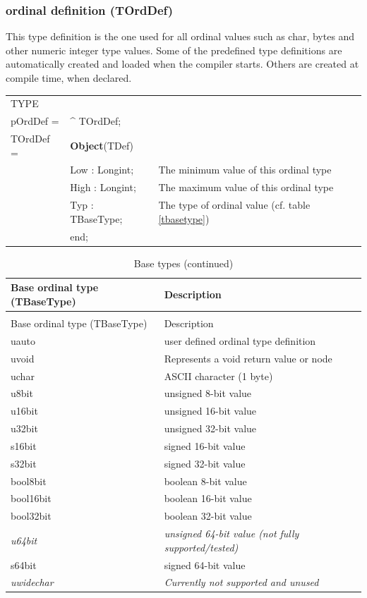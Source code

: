 \documentclass [a4paper,12pt]{article}
\begin{document}
\subsubsection{ordinal definition (TOrdDef)}
\label{subsubsec:ordinal}

This type definition is the one used for all ordinal values such as char,
bytes and other numeric integer type values. Some of the predefined type
definitions are automatically created and loaded when the compiler starts.
Others are created at compile time, when declared.

\begin{tabular*}{6.5in}{|l@{\extracolsep{\fill}}lp{9cm}|}
\hline
\textsf{TYPE} & &  \\
\xspace pOrdDef = & \^{}  TOrdDef; & \\
\xspace \textsf{TOrdDef} = & \textbf{Object}(TDef) & \\
&\textsf{Low : Longint;}&
    The minimum value of this ordinal type \\
&\textsf{High : Longint;}&
    The maximum value of this ordinal type \\
&\textsf{Typ : TBaseType;}&
    The type of ordinal value (cf. table \ref{tbasetype}) \\
&\textsf{end;}&  \\
\hline
\end{tabular*}

\begin{longtable}{|l|p{10cm}|}
\caption{Base types}\label{tbasetyp}\\
\hline
Base ordinal type (TBaseType) & Description \\
\hline
\endfirsthead
\caption{Base types (continued)}\\
\hline
Base ordinal type (TBaseType) & Description \\
\hline
\endhead
\hline
\endfoot
\textsf{uauto} & user defined ordinal type definition \\
\textsf{uvoid} & Represents a void return value or node \\
\textsf{uchar} & ASCII character (1 byte) \\
\textsf{u8bit} & unsigned 8-bit value \\
\textsf{u16bit}& unsigned 16-bit value \\
\textsf{u32bit}& unsigned 32-bit value \\
\textsf{s16bit}& signed 16-bit value \\
\textsf{s32bit}& signed 32-bit value \\
\textsf{bool8bit}& boolean 8-bit value \\
\textsf{bool16bit}& boolean 16-bit value \\
\textsf{bool32bit}& boolean 32-bit value \\
\textsf{\textit{u64bit}}&
    \textit{unsigned 64-bit value (not fully supported/tested)} \\
\textsf{s64bit}& signed 64-bit value \\\textsf{\textit{uwidechar}}&
    \textit{Currently not supported and unused} \\
\end{longtable}
\end{document}
